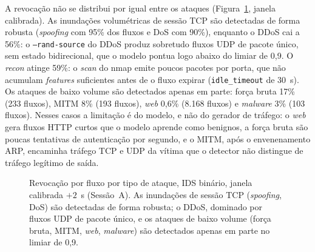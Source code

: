 \documentclass[12pt,a4paper]{article}
\begin{document}
A revocação não se distribui por igual entre os ataques
(Figura~\ref{fig:detection_rate}, janela calibrada). As inundações volumétricas
de sessão TCP são detectadas de forma robusta (\textit{spoofing} com 95\% dos
fluxos e DoS com 90\%), enquanto o DDoS cai a 56\%: o \texttt{--rand-source} do
DDoS produz sobretudo fluxos UDP de pacote único, sem estado bidirecional, que o
modelo pontua logo abaixo do limiar de 0,9. O \textit{recon} atinge 59\%: o
\textit{scan} do nmap emite poucos pacotes por porta, que não acumulam
\textit{features} suficientes antes de o fluxo expirar (\texttt{idle\_timeout} de
30~s). Os ataques de baixo volume são detectados apenas em parte: força bruta 17\%
(233 fluxos), MITM 8\% (193 fluxos), \textit{web} 0,6\% (8.168 fluxos) e
\textit{malware} 3\% (103 fluxos). Nesses casos a limitação é do modelo, e não do
gerador de tráfego: o \textit{web} gera fluxos HTTP curtos que o modelo aprende
como benignos, a força bruta são poucas tentativas de autenticação por segundo, e
o MITM, após o envenenamento ARP, encaminha tráfego TCP e UDP da vítima que o
detector não distingue de tráfego legítimo de saída.

\begin{figure}[ht]
\centering
{}
\caption{Revocação por fluxo por tipo de ataque, IDS binário, janela calibrada
$+2$~s (Sessão~A). As inundações de sessão TCP (\textit{spoofing}, DoS) são
detectadas de forma robusta; o DDoS, dominado por fluxos UDP de pacote único, e os
ataques de baixo volume (força bruta, MITM, \textit{web}, \textit{malware}) são
detectados apenas em parte no limiar de 0,9.}
\label{fig:detection_rate}
\end{figure}
\end{document}
